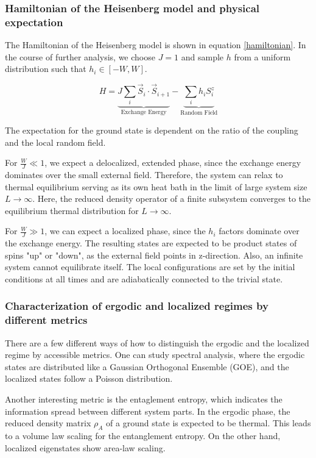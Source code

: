 \documentclass[reprint,amsmath,amssymb,aps,prb]{revtex4-2}
\begin{document}
\subsubsection{Hamiltonian of the Heisenberg model and physical expectation}

The Hamiltonian of the Heisenberg model is shown in equation \ref{hamiltonian}. In the course of further analysis, we choose $J=1$ and sample $h$ from a uniform distribution such that $h_i \in \left[-W, W\right]$.

\begin{equation}
	H=\underbrace{J\sum_i \vec{S}_i\cdot\vec{S}_{i+1}}_{\text{Exchange Energy}}-\underbrace{\sum_ih_iS_i^z}_{\text{Random Field}}\label{hamiltonian}
\end{equation}

The expectation for the ground state is dependent on the ratio of the coupling and the local random field. 

For $\frac{W}{J} \ll 1$, we expect a delocalized, extended phase, since the exchange energy dominates over the small external field. Therefore, the system can relax to thermal equilibrium serving as its own heat bath in the limit of large system size $L\rightarrow\infty$.
Here, the reduced density operator of a finite subsystem converges to the equilibrium thermal distribution
for $L\rightarrow\infty$.\cite{Pal2010}

For $\frac{W}{J} \gg 1$, we can expect a localized phase, since the $h_i$ factors dominate over the exchange energy. The resulting states are expected to be product states of spins "up" or "down", as the external field points in z-direction. Also, an infinite system cannot equilibrate itself. The local configurations are set by the initial conditions at all times and are adiabatically connected to the trivial state.\cite{Pal2010}

\subsubsection{Characterization of ergodic and localized regimes by different metrics}

There are a few different ways of how to distinguish the ergodic and the localized regime by accessible metrics. 
One can study spectral analysis, where the ergodic states are distributed like a Gaussian Orthogonal Ensemble (GOE), and the localized states follow a Poisson distribution.\cite{Laumann2014}

Another interesting metric is the entaglement entropy, which indicates the information spread between different system parts.\cite{Nandkishore_2015} In the ergodic phase, the reduced density matrix $\rho_A$ of a ground state is expected to be thermal. This leads to a volume law scaling for the entanglement entropy.\cite{Altman_2015}	On the other hand, localized eigenstates show area-law scaling.\cite{yu2019bulk}
\end{document}
